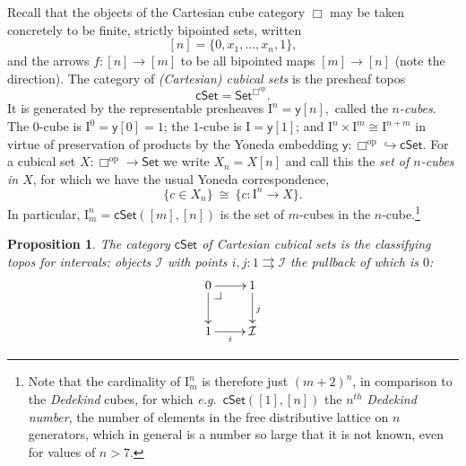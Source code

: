 \documentclass[11pt]{amsart}
\makeatletter
\newcommand{\eg}{\emph{e.g.}}
\newcommand{\psh}[1]{\ensuremath{\mathsf{Set}^{#1^{\mathrm{op}}}}}
\newcommand{\Set}{\ensuremath{\mathsf{Set}}}
\newcommand{\cSet}{\ensuremath{\mathsf{cSet}}}
\newcommand{\yon}{\ensuremath{\mathsf{y}}} %
\newcommand{\op}[1]{\ensuremath{{#1}^{\mathrm{op}}}}
\newcommand{\hook}{\ensuremath{\hookrightarrow}}
\renewcommand{\to}{\ensuremath{\rightarrow}}
\newcommand{\I}{\ensuremath{\mathrm{I}}}
\newtheorem{proposition}[theorem]{Proposition}
\theoremstyle{remark}
\theoremstyle{definition}
\newcommand{\pbcorner}[1][dr]{\save*!/#1-1.2pc/#1:(-1,1)@^{|-}\restore}
\makeatother
\begin{document}
Recall that the objects of the Cartesian cube category $\Box$ may be taken concretely to be finite, strictly bipointed sets, written $$[n] = \{0, x_1, ..., x_n, 1\},$$ and the arrows $f : [n] \to [m]$ to be all bipointed maps $[m]\to [n]$ (note the direction). 
The category of \emph{(Cartesian) cubical sets} is the presheaf topos
\[
\cSet =  \psh{\Box}.
\]
It is generated by the representable presheaves $\I^n = \yon[n],$ called the \emph{$n$-cubes}.  The $0$-cube is $\I^0 = \yon[0] =1$; the $1$-cube is $\I = \yon[1]$; and $\I^n \times \I^m \cong \I^{n+m}$ in virtue of preservation of products by the Yoneda embedding $\yon : \op{\Box} \hook\cSet$.  For a cubical set $X: \op{\Box} \to \Set$ we write $X_n = X[n]$ and call this the \emph{set of $n$-cubes in $X$}, for which we have the usual Yoneda correspondence,
\[
\{c \in X_n \} \ \cong\ \{c : \I^n \to X\}.
\]
In particular, $\I^n_m = \cSet([m],[n])$ is the set of $m$-cubes in the $n$-cube.\footnote{Note that the cardinality of $\I^n_m$ is therefore just $(m+2)^n$, in comparison to the \emph{Dedekind} cubes, for which \eg\ $\cSet([1],[n])$ the $n^{th}$ \emph{Dedekind number}, the number of elements in the free distributive lattice on $n$ generators, which in general is  a number so large that it is not known, even for values of $n>7$.} 

\begin{proposition}
The category $\cSet$ of Cartesian cubical sets is the classifying topos for \emph{intervals}: objects $\mathcal{I}$ with points $i,j:1\rightrightarrows \mathcal{I}$ the pullback of which is $0$:
\[
\xymatrix{
0 \ar[d] \ar[r] \pbcorner & 1 \ar[d]^j  \\
1 \ar[r]_i & \mathcal{I}
}
\]
\end{proposition}
\end{document}
